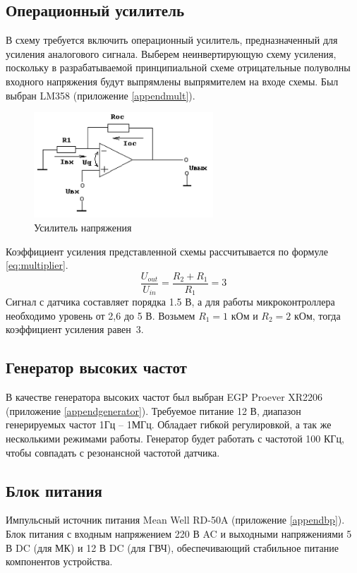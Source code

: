 \subsection{Операционный усилитель}
В схему требуется включить операционный усилитель, предназначенный для усиления аналогового сигнала. Выберем неинвертирующую схему усиления, поскольку в разрабатываемой принципиальной схеме отрицательные полуволны входного напряжения будут выпрямлены выпрямителем на входе схемы. Был выбран LM358 (приложение \ref{appendmult}).

\begin{figure}[ht]
	\centering
	\includegraphics[width=0.6\textwidth]{./images/multiplier.png}
	\caption{Усилитель напряжения}
	\label{fig:multiplier}
\end{figure}
Коэффициент усиления представленной схемы рассчитывается по формуле \ref{eq:multiplier}.
\begin{equation}
    \label{eq:multiplier}
    \frac{U_{out}}{U_{in}} = \frac{R_{2} + R_1}{R_1} = 3
\end{equation}
Сигнал с датчика составляет порядка 1.5 В, а для работы микроконтроллера необходимо уровень от 2,6 до 5 В. 
Возьмем \(R_1 = 1\) кОм и \(R_2 = 2\) кОм, тогда коэффициент усиления равен~3.

\subsection{Генератор высоких частот}

В качестве генератора высоких частот был выбран EGP Proever XR2206 (приложение \ref{appendgenerator}). Требуемое питание 12 В, диапазон генерируемых частот 1Гц -- 1МГц. Обладает гибкой регулировкой, а так же несколькими режимами работы. Генератор будет работать с частотой 100 КГц, чтобы совпадать с резонансной частотой датчика.

\subsection{Блок питания}
Импульсный источник питания Mean Well RD-50A (приложение \ref{appendbp}). Блок питания с входным напряжением 220 В AC и выходными напряжениями 5 В DC (для МК) и 12 В DC (для ГВЧ), обеспечивающий стабильное питание компонентов устройства.

